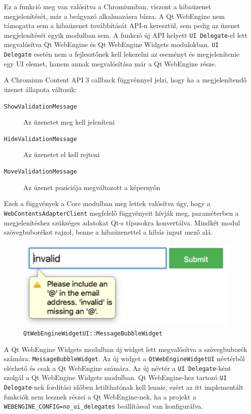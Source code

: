 \documentclass[12pt]{report}
\begin{document}
Ez a funkció meg van valósítva a Chromiumban, viszont a hibaüzenet megjelenítését, már
a beágyazó alkalmazásra bízza. A Qt WebEngine nem támogatta sem a hibaüzenet továbbítását
API-n keresztül, sem pedig az üzenet megjelenítését egyik modulban sem. A funkció új API
helyett \texttt{UI Delegate}-el lett megvalósítva Qt WebEngine és Qt WebEngine Widgets
modulokban. \texttt{UI Delegate} esetén nem a fejlesztőnek kell lekezelni az eseményt és
megjelenítenie egy UI elemet, hanem annak megvalósítása már a Qt WebEngine része.

A Chromium Content API 3 callback függvénnyel jelzi, hogy ha a megjelenítendő üzenet állapota
változik:
\begin{description}
    \item[\texttt{ShowValidationMessage}] Az üzenetet meg kell jeleníteni
    \item[\texttt{HideValidationMessage}] Az üzenetet el kell rejteni
    \item[\texttt{MoveValidationMessage}] Az üzenet pozíciója megváltozott a képernyőn
\end{description}
Ezek a függvények a Core modulban meg lettek valósítva úgy, hogy a
\texttt{WebContentsAdapterClient} megfelelő függvényeit hívják meg, paraméterben
a megjelenítéshez szükséges adatokat Qt-s típusokra konvertálva. Mindkét modul
szövegbuborékot rajzol, benne a hibaüzenettel a hibás input mező alá.

\begin{figure}[h]
    \centering
    \includegraphics[scale=0.75]{bubi-widget-screenshot}
    \caption{
        \label{fig:bubi-widget-screenshot}
        \texttt{QtWebEngineWidgetUI::MessageBubbleWidget}
    }
\end{figure}

A Qt WebEngine Widgets modulban új widget lett megvalósítva a szövegbuborék számára:
\texttt{MessageBubbleWidget}. Az új widget a \texttt{QtWebEngineWidgetUI} névtérből
elérhető és csak a Qt WebEngine számára. Az új névtér a \texttt{UI Delegate}-ként szolgál
a Qt WebEngine Widgets modulban. Qt WebEngine-hez tartozó \texttt{UI Delegate}-nek fordítási
időben letilthatónak kell lennie, ezért az itt implementált funkciók nem lesznek részei
a Qt WebEngine-nek, ha a projekt a \texttt{WEBENGINE\_CONFIG=no\_ui\_delegates} beállítással
van konfigurálva.
\end{document}
